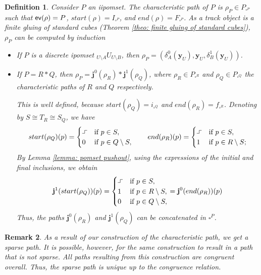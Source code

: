 \documentclass[11pt,a4paper,oldfontcommands]{memoir}
\newcommand*\ev{\textup{\textsf{ev}}}
\newcommand*\subid[3]{{}_{#1}#2_{#3}}
\newcommand*\exec{%
  \raisebox{1pt}{%
    \begin{tikzpicture}[x=.8ex,y=1ex,-]
      \draw (0,0) -- (1,0) -- (1,1) -- (2,1);
    \end{tikzpicture}}}
\newcommand*\pobj[1]{\square^{#1}}
\newcommand*\jneda{\mathbf{j}}
\newtheorem{definition}{Definition}
\newtheorem{remark}[definition]{Remark}
\begin{document}
\begin{definition}\label{def: char path}
    Consider $P$ an iipomset. The characteristic path of $P$ is $\rho_P \in P_{\pobj{P}}$ such that $\ev(\rho)=P$, $start(\rho)=I_{\square^P}$, and $end(\rho)=F_{\square^P}$. As a track object is a finite gluing of standard cubes (Theorem \ref{theo: finite gluing of standard cubes}),  $\rho_P$ can be computed by induction
        \begin{itemize}
        \item  If $P$ is a discrete ipomset $\subid{U\setminus A}{U}{U\setminus B}$, then $\rho_P=(\delta^0_A(\mathbf{y}_U),\mathbf{y}_U,\delta^1_B(\mathbf{y}_U))$.
        \item If $P=R*Q$, then $\rho_P=\jneda^0(\rho_R)*\jneda^1(\rho_Q)$, where $\rho_R \in P_{\square^R}$ and $\rho_Q \in P_{\square^Q}$ the characteristic paths of $R$ and $Q$ respectively. 
        
        This is well defined, because $start(\rho_Q)=i_{ \pobj{ Q}}$ and $end(\rho_R)=f_{ \pobj{ R}}$. Denoting by $S \cong T_R \cong S_Q$, we have 
    \begin{equation*}
      start(\rho_Q)(p)=
      \begin{cases}
        \exec & \text{if } p\in S, \\
        0 & \text{if } p\in Q\setminus S,
      \end{cases}
      \qquad
      end(\rho_R)(p)=
      \begin{cases}
        \exec & \text{if } p\in S, \\
        1 & \text{if } p\in R\setminus S;
      \end{cases}
    \end{equation*}
       By Lemma \ref{lemma: pomset pushout}, using the expressions of the initial and final inclusions, we obtain
 \begin{equation*}
      \jneda^1 (start(\rho_Q))(p)=
      \begin{cases}
        \exec & \text{if } p\in S, \\
        1 & \text{if } p\in R \setminus S, \\
        0 & \text{if } p\in Q\setminus S,
      \end{cases}
     =\jneda^0 (end(\rho_R))(p)
    \end{equation*}
     Thus, the paths $\jneda^0(\rho_R)$ and $\jneda^1(\rho_Q)$ can be concatenated in $\square^P$. %
    \end{itemize} 
\end{definition}
\begin{remark}
    As a result of our construction of the characteristic path, we get a sparse path. It is possible, however, for the same construction to result in a path that is not sparse. All paths resulting from this construction are congruent overall. Thus, the sparse path is unique up to the congruence relation.
\end{remark}
\end{document}
